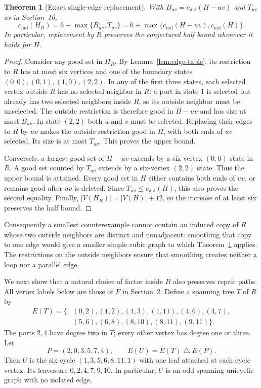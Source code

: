 \documentclass[11pt]{article}
\newtheorem{theorem}{Theorem}[section]
\newcommand{\cind}{c_{\mathrm{ind}}}
\begin{document}
\begin{theorem}[Exact single-edge replacement]\label{thm:single-replacement}
With $B_{uv}=\cind(H-uv)$ and $T_{uv}$ as in Section~10,
\[
 \cind(H_R)=6+\max\{B_{uv},T_{uv}\}
             =6+\max\{\cind(H-uv),\cind(H)\}.
\]
In particular, replacement by $R$ preserves the conjectured half
bound whenever it holds for $H$.
\end{theorem}
\begin{proof}
Consider any good set in $H_R$. By Lemma~\ref{lem:edge-table},
its restriction to $R$ has at most six vertices and one of the
boundary states $(0,0),(0,1),(1,0),(2,2)$.
In any of the first three states, each selected vertex outside
$R$ has no selected neighbor in $R$: a port in state $1$ is
selected but already has two selected neighbors inside $R$, so
its outside neighbor must be unselected. The outside restriction
is therefore good in $H-uv$ and has size at most $B_{uv}$.
In state $(2,2)$ both $u$ and $v$ must be selected. Replacing
their edges to $R$ by $uv$ makes the outside restriction good in
$H$, with both ends of $uv$ selected. Its size is at most $T_{uv}$.
This proves the upper bound.

Conversely, a largest good set of $H-uv$ extends by a six-vertex
$(0,0)$ state in $R$. A good set counted by $T_{uv}$ extends by
a six-vertex $(2,2)$ state. Thus the upper bound is attained.
Every good set in $H$ either contains both ends of $uv$, or
remains good after $uv$ is deleted. Since $T_{uv}\leq\cind(H)$,
this also proves the second equality. Finally,
$|V(H_R)|=|V(H)|+12$, so the increase of at least six preserves
the half bound.\qedhere
\end{proof}

Consequently a smallest counterexample cannot contain an induced
copy of $R$ whose two outside neighbors are distinct and nonadjacent:
smoothing that copy to one edge would give a smaller simple cubic
graph to which Theorem~\ref{thm:single-replacement} applies.
The restrictions on the outside neighbors ensure that smoothing
creates neither a loop nor a parallel edge.

We next show that a natural choice of factor inside $R$ also
preserves repair paths. All vertex labels below are those of $F$
in Section~2. Define a spanning tree $T$ of $R$ by
\begin{align*}
 E(T)=\{&(0,2),(1,2),(1,3),(1,11),(4,6),(4,7),\\
        &(5,6),(6,8),(8,10),(8,11),(9,11)\}.
\end{align*}
The ports $2,4$ have degree two in $T$; every other vertex has
degree one or three. Let
\[
 P=(2,0,3,5,7,4),\qquad E(U)=E(T)\mathbin{\triangle}E(P).
\]
Then $U$ is the six-cycle $(1,3,5,6,8,11,1)$ with one leaf
attached at each cycle vertex. Its leaves are
$0,2,4,7,9,10$. In particular, $U$ is an odd spanning unicyclic
graph with no isolated edge.
\end{document}
